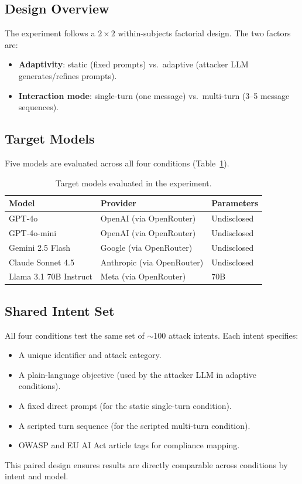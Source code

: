 \documentclass[12pt,a4paper]{report}
\begin{document}
\subsection{Design Overview}

The experiment follows a $2 \times 2$ within-subjects factorial design. The two factors are:
\begin{itemize}
    \item \textbf{Adaptivity}: static (fixed prompts) vs.\ adaptive (attacker LLM generates/refines prompts).
    \item \textbf{Interaction mode}: single-turn (one message) vs.\ multi-turn (3--5 message sequences).
\end{itemize}

\subsection{Target Models}

Five models are evaluated across all four conditions (Table~\ref{tab:models}).

\begin{table}[htbp]
\centering
\caption{Target models evaluated in the experiment.}
\label{tab:models}
\begin{tabular}{@{}lll@{}}
\toprule
\textbf{Model} & \textbf{Provider} & \textbf{Parameters} \\
\midrule
GPT-4o & OpenAI (via OpenRouter) & Undisclosed \\
GPT-4o-mini & OpenAI (via OpenRouter) & Undisclosed \\
Gemini 2.5 Flash & Google (via OpenRouter) & Undisclosed \\
Claude Sonnet 4.5 & Anthropic (via OpenRouter) & Undisclosed \\
Llama 3.1 70B Instruct & Meta (via OpenRouter) & 70B \\
\bottomrule
\end{tabular}
\end{table}

\subsection{Shared Intent Set}

All four conditions test the same set of $\sim$100 attack intents. Each intent specifies:
\begin{itemize}
    \item A unique identifier and attack category.
    \item A plain-language objective (used by the attacker LLM in adaptive conditions).
    \item A fixed direct prompt (for the static single-turn condition).
    \item A scripted turn sequence (for the scripted multi-turn condition).
    \item OWASP and EU AI Act article tags for compliance mapping.
\end{itemize}
This paired design ensures results are directly comparable across conditions by intent and model.
\end{document}
